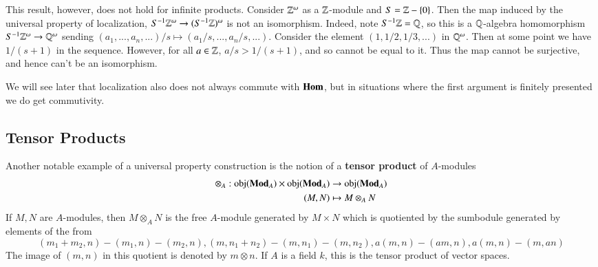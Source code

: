 This result, however, does not hold for infinite products. Consider $\mathbb Z^{\omega}$ as a $\mathbb Z$-module and $S = \mathbb Z-\{0\}$. Then the map induced by the universal property of localization, $S^{-1}\mathbb Z^{\omega}\rightarrow (S^{-1}\mathbb Z)^{\omega}$ is not an isomorphism. Indeed, note $S^{-1}\mathbb Z = \mathbb Q$, so this is a $\mathbb Q$-algebra homomorphism $S^{-1}\mathbb Z^{\omega}\rightarrow \mathbb Q^{\omega}$ sending $(a_1,...,a_n,...)/s \mapsto (a_1/s,...,a_n/s,...)$. Consider the element $(1,1/2,1/3,...)$ in $\mathbb Q^{\omega}$. Then at some point we have $1/(s+1)$ in the sequence. However, for all $a \in \mathbb Z$, $a/s > 1/(s+1)$, and so cannot be equal to it. Thus the map cannot be surjective, and hence can't be an isomorphism.

\begin{remark}
    We will see later that localization also does not always commute with $\mathbf{Hom}$, but in situations where the first argument is finitely presented we do get commutivity.
\end{remark}

\subsection{Tensor Products}

Another notable example of a universal property construction is the notion of a \textbf{tensor product} of $A$-modules \begin{align*}
    \otimes_A:\text{obj}(\normalfont\textbf{Mod}_A)\times \text{obj}(\normalfont\textbf{Mod}_A)&\rightarrow \text{obj}(\normalfont\textbf{Mod}_A) \\
    (M,N)&\mapsto M\otimes_AN
\end{align*}
If $M,N$ are $A$-modules, then $M\otimes_AN$ is the free $A$-module generated by $M\times N$ which is quotiented by the sumbodule generated by elements of the from $$(m_1+m_2,n)-(m_1,n)-(m_2,n),(m,n_1+n_2)-(m,n_1)-(m,n_2),a(m,n)-(am,n),a(m,n)-(m,an)$$
The image of $(m,n)$ in this quotient is denoted by $m\otimes n$. If $A$ is a field $k$, this is the tensor product of vector spaces.

